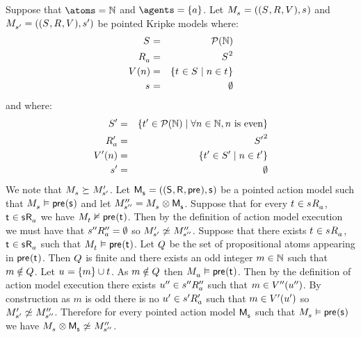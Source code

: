 \begin{example}
Suppose that $\atoms = \naturals$ and $\agents = \{\agentA\}$.
Let $\kPModelAndTuple{\kStateS}$ and $\kPModelAndTuple{\kStateSP}$ be pointed Kripke models where:
\begin{eqnarray*}
    \kStates &=& \powerset(\naturals)\\
    \kAccessibilityA &=& \kStates^2\\
    \kValuation(n) &=& \{\kStateT \in \kStates \mid n \in \kStateT\}\\
    \kStateS &=& \emptyset
\end{eqnarray*}
and where:
\begin{eqnarray*}
    {S^{\prime}} &=& \{{t}^{\prime} \in \mathcal{P}(\mathbb{N}) \mid \forall n \in \mathbb{N}, n \text{ is even}\}\\
    {R^{\prime}_{a}} &=& {S^{\prime}}^2\\
    {V^{\prime}}(n) &=& \{{t}^{\prime} \in {S^{\prime}} \mid n \in {t}^{\prime}\}\\
    {s}^{\prime} &=& \emptyset
\end{eqnarray*}
We note that $\kPModel{\kStateS} \simulates \kPModelP{\kStateSP}$.
Let $\aPModelAndTuple{\aStateS}$ be a pointed action model such that $\kPModel{\kStateS} \entails \aPrecondition(\aStateS)$ and let $\kPModelPP{\kStateSPP} = \kPModel{\kStateS} \exec \aPModel{\aStateS}$.
Suppose that for every $\kStateT \in \kSuccessorsA{\kStateS}$, $\aStateT \in \aSuccessorsA{\aStateS}$ we have $\kPModel{\kStateT} \nentails \aPrecondition(\aStateT)$.
Then by the definition of action model execution we must have that ${{s}^{\prime\prime}} {R^{\prime\prime}_{a}} = \emptyset$ so $\kPModelP{\kStateSP} \not\bisimilar \kPModelPP{\kStateSPP}$.
Suppose that there exists $\kStateT \in \kSuccessorsA{\kStateS}$, $\aStateT \in \aSuccessorsA{\aStateS}$ such that $\kPModel{\kStateT} \entails \aPrecondition(\aStateT)$.
Let $Q$ be the set of propositional atoms appearing in $\aPrecondition(\aStateT)$.
Then $Q$ is finite and there exists an odd integer $m \in \mathbb{N}$ such that $m \notin Q$.
Let $\kStateU = \{m\} \cup \kStateT$.
As $m \notin Q$ then $\kPModel{\kStateU} \entails \aPrecondition(\aStateT)$.
Then by the definition of action model execution there exists ${u}^{\prime\prime} \in {{s}^{\prime\prime}} {R^{\prime\prime}_{a}}$ such that $m \in {V^{\prime\prime}}({u}^{\prime\prime})$.
By construction as $m$ is odd there is no ${u}^{\prime} \in {{s}^{\prime}} {R^{\prime}_{a}}$ such that $m \in {V^{\prime}}({u}^{\prime})$ so $\kPModelP{\kStateSP} \not\bisimilar \kPModelPP{\kStateSPP}$.
Therefore for every pointed action model $\aPModel{\aStateS}$ such that $\kPModel{\kStateS} \entails \aPrecondition(\aStateS)$ we have $\kPModel{\kStateS} \exec \aPModel{\aStateS} \not\bisimilar \kPModelPP{\kStateSPP}$.
\end{example}

